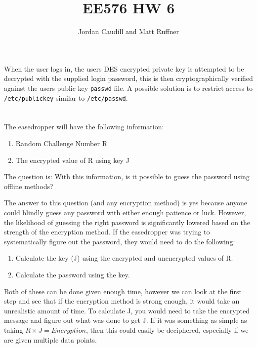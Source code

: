 \documentclass[letterpaper]{article}
\title{EE576 HW 6}
\author{Jordan Caudill and Matt Ruffner}
\begin{document}
\maketitle


\section{}
When the user logs in, the users DES encrypted private key is attempted to be decrypted with the supplied login password, this is then cryptographically verified against the users public key \texttt{passwd} file. A possible solution is to restrict access to \texttt{/etc/publickey} similar to \texttt{/etc/passwd}.

\section{}

The easedropper will have the following information:

\begin{enumerate}
    \item Random Challenge Number R
    \item The encrypted value of R using key J
\end{enumerate}

The question is: With this information, is it possible to guess the password using offline methods?

The answer to this question (and any encryption method) is yes because anyone could blindly guess any password with either enough patience or luck. However, the likelihood of guessing the right password is significantly lowered based on the strength of the encryption method. If the easedropper was trying to systematically figure out the password, they would need to do the following:
\begin{enumerate}
    \item Calculate the key (J) using the encrypted and unencrypted values of R.
    \item Calculate the password using the key.
\end{enumerate}

Both of these can be done given enough time, however we can look at the first step and see that if the encryption method is strong enough, it would take an unrealistic amount of time. To calculate J, you would need to take the encrypted message and figure out what was done to get J. If it was something as simple as taking $R \times J = Encryption$, then this could easily be deciphered, especially if we are given multiple data points.
\end{document}
